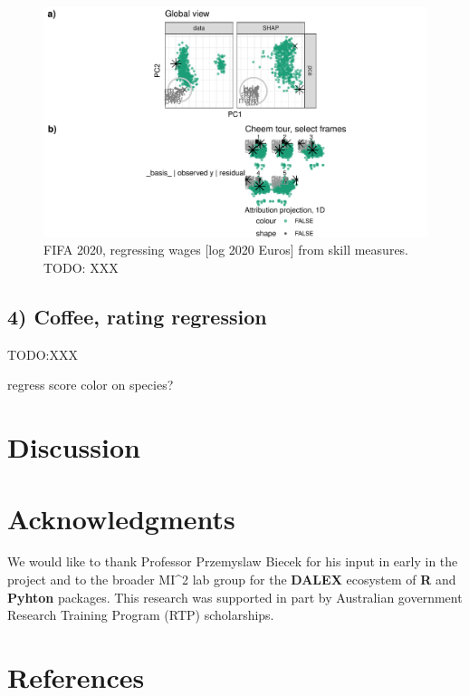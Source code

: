\documentclass[
]{article}
\begin{document}
\begin{figure}

{\centering \includegraphics[width=1\linewidth]{./figures/case_fifa} 

}

\caption{FIFA 2020, regressing wages [log 2020 Euros] from skill measures. TODO: XXX}\label{fig:casefifa}
\end{figure}

\hypertarget{coffee-rating-regression}{%
\subsection{4) Coffee, rating regression}\label{coffee-rating-regression}}

TODO:XXX

regress score color on species?

\hypertarget{sec:discussion}{%
\section{Discussion}\label{sec:discussion}}

\hypertarget{acknowledgments}{%
\section{Acknowledgments}\label{acknowledgments}}

We would like to thank Professor Przemyslaw Biecek for his input in early in the project and to the broader MI\^{}2 lab group for the \textbf{DALEX} ecosystem of \textbf{R} and \textbf{Pyhton} packages. This research was supported in part by Australian government Research Training Program (RTP) scholarships.

\hypertarget{references}{%
\section*{References}\label{references}}
\end{document}
